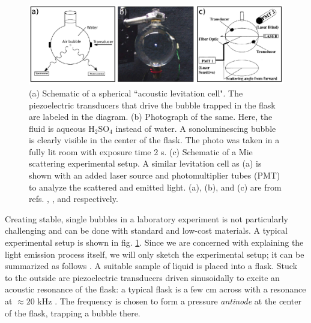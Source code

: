 \documentclass[11pt,prb,aps,nofootinbib,superscriptaddress,floatfix]{revtex4-2}
\begin{document}
\begin{figure}
\includegraphics[width=0.9\linewidth]{figs/flask.pdf}
    \caption{(a) Schematic of a spherical ``acoustic levitation cell". The piezoelectric transducers that drive the bubble trapped in the flask are labeled in the diagram. (b) Photograph of the same. Here, the fluid is aqueous H$_2$SO$_4$ instead of water. A sonoluminescing bubble is clearly visible in the center of the flask. The photo was taken in a fully lit room with exposure time 2 s. (c) Schematic of a Mie scattering experimental setup. A similar levitation cell as (a) is shown with an added laser source and photomultiplier tubes (PMT) to analyze the scattered and emitted light. (a), (b), and (c) are from refs. \cite{brenner2002single}, \cite{suslick2008inside}, and \cite{gompf2000mie} respectively.}
\label{fig:flask}
\end{figure}

Creating stable, single bubbles in a laboratory experiment is not particularly challenging and can be done with standard and low-cost materials. A typical experimental setup is shown in fig. \ref{fig:flask}. Since we are concerned with explaining the light emission process itself, we will only sketch the experimental setup; it can be summarized as follows \cite{lentz1995mie,gaitan1990experimental,gaitan1992sonoluminescence,gompf2000mie,brenner2002single,yasui2018acoustic,brennen2014cavitation,suslick2008inside}. A suitable sample of liquid is placed into a flask. Stuck to the outside are piezoelectric transducers driven sinusoidally to excite an acoustic resonance of the flask: a typical flask is a few cm across with a resonance at $\approx 20$ kHz \cite{brenner2002single}. The frequency is chosen to form a pressure \emph{antinode} at the center of the flask, trapping a bubble there.
\end{document}
